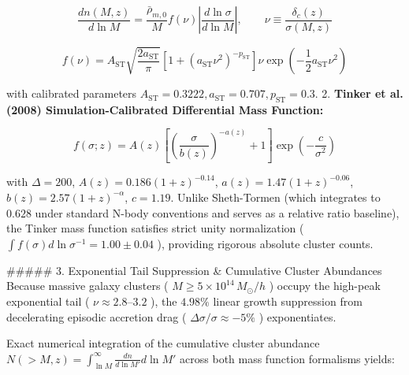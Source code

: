 \documentclass[11pt,a4paper]{article}
\theoremstyle{definition}
\theoremstyle{remark}
\begin{document}
\begin{equation}
\frac{dn(M, z)}{d\ln M} = \frac{\bar{\rho}_{m,0}}{M} f(\nu) \left| \frac{d\ln\sigma}{d\ln M} \right|, \qquad \nu \equiv \frac{\delta_c(z)}{\sigma(M, z)}
\end{equation}



\begin{equation}
f(\nu) = A_{\text{ST}} \sqrt{\frac{2 a_{\text{ST}}}{\pi}} \left[ 1 + (a_{\text{ST}} \nu^2)^{-p_{\text{ST}}} \right] \nu \exp\left(-\frac{1}{2} a_{\text{ST}} \nu^2\right)
\end{equation}


with calibrated parameters $A_{\text{ST}} = 0.3222, a_{\text{ST}} = 0.707, p_{\text{ST}} = 0.3$.
2. \textbf{Tinker et al. (2008) Simulation-Calibrated Differential Mass Function:}


\begin{equation}
f(\sigma; z) = A(z) \left[ \left( \frac{\sigma}{b(z)} \right)^{-a(z)} + 1 \right] \exp\left( -\frac{c}{\sigma^2} \right)
\end{equation}


with $\Delta = 200$, $A(z) = 0.186(1+z)^{-0.14}$, $a(z) = 1.47(1+z)^{-0.06}$, $b(z) = 2.57(1+z)^{-\alpha}$, $c = 1.19$. Unlike Sheth-Tormen (which integrates to $0.628$ under standard N-body conventions and serves as a relative ratio baseline), the Tinker mass function satisfies strict unity normalization ( $\int f(\sigma) d\ln\sigma^{-1} = 1.00 \pm 0.04$ ), providing rigorous absolute cluster counts.

\#\#\#\#\# 3. Exponential Tail Suppression \& Cumulative Cluster Abundances
Because massive galaxy clusters ( $M \ge 5 \times 10^{14} \, M_\odot/h$ ) occupy the high-peak exponential tail ( $\nu \approx 2.8\text{--}3.2$ ), the $4.98\%$ linear growth suppression from decelerating episodic accretion drag ( $\Delta\sigma/\sigma \approx -5\%$ ) exponentiates.

Exact numerical integration of the cumulative cluster abundance $N(>M, z) = \int_{\ln M}^\infty \frac{dn}{d\ln M'} d\ln M'$ across both mass function formalisms yields:
\end{document}

